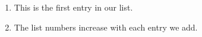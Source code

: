 \documentclass{article}
\begin{document}
	\begin{enumerate}
		\item This is the first entry in our list.
		\item The list numbers increase with each entry we add.
	\end{enumerate}
\end{document}
